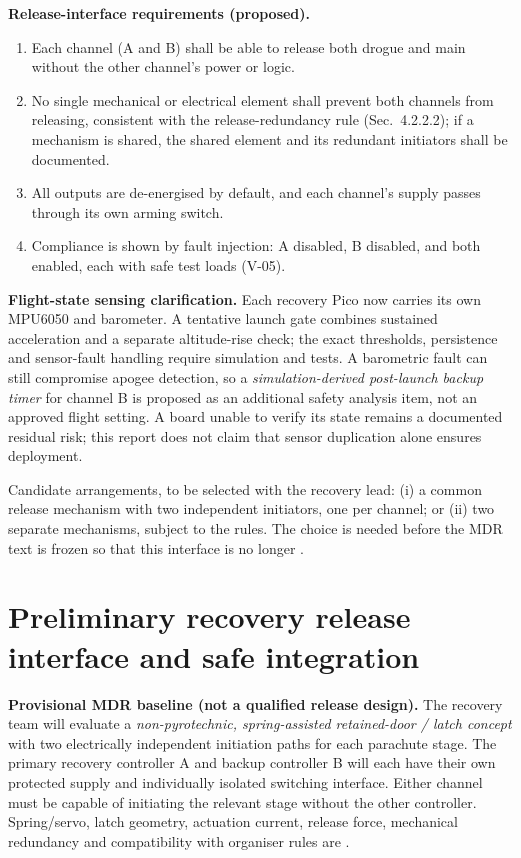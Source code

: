 \textbf{Release-interface requirements (proposed).}
\begin{enumerate}[label=R\arabic*.]
\item Each channel (A and B) shall be able to release both drogue and main without the other channel's power or logic.
\item No single mechanical or electrical element shall prevent both channels from releasing, consistent with the release-redundancy rule \cite{rtc2027app03} (Sec.~4.2.2.2); if a mechanism is shared, the shared element and its redundant initiators shall be documented.
\item All outputs are de-energised by default, and each channel's supply passes through its own arming switch.
\item Compliance is shown by fault injection: A disabled, B disabled, and both enabled, each with safe test loads (V-05).
\end{enumerate}
\textbf{Flight-state sensing clarification.} Each recovery Pico now carries its own MPU6050 and barometer. A tentative launch gate combines sustained acceleration and a separate altitude-rise check; the exact thresholds, persistence and sensor-fault handling require simulation and tests. A barometric fault can still compromise apogee detection, so a \emph{simulation-derived post-launch backup timer} for channel B is proposed as an additional safety analysis item, not an approved flight setting. A board unable to verify its state remains a documented residual risk; this report does not claim that sensor duplication alone ensures deployment.

Candidate arrangements, to be selected with the recovery lead: (i) a common release mechanism with two independent initiators, one per channel; or (ii) two separate mechanisms, subject to the rules. The choice is needed before the MDR text is frozen so that this interface is no longer .


\section{Preliminary recovery release interface and safe integration}
\label{sec:release}
\textbf{Provisional MDR baseline (not a qualified release design).} The recovery team will evaluate a \emph{non-pyrotechnic, spring-assisted retained-door / latch concept} with two electrically independent initiation paths for each parachute stage. The primary recovery controller A and backup controller B will each have their own protected supply and individually isolated switching interface. Either channel must be capable of initiating the relevant stage without the other controller. Spring/servo, latch geometry, actuation current, release force, mechanical redundancy and compatibility with organiser rules are  \cite{rtc2027app03,bakirci2022recovery}.


